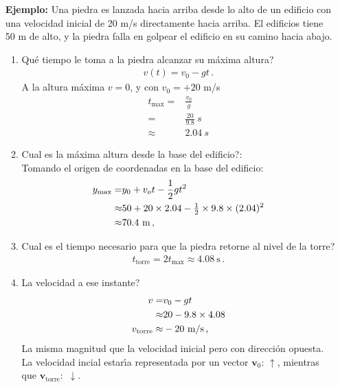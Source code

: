 \begin{itemize}
\item[\textbf{Ejemplo:}] Una piedra es lanzada hacia arriba desde lo alto de un edificio con una velocidad inicial de 20 m/s directamente hacia arriba. El edificios tiene 50 m de alto, y la piedra falla en golpear el edificio en su camino hacia abajo.
  \begin{enumerate}
  \item \textquestiondown Qu\'e tiempo le toma a la piedra alcanzar su m\'axima altura?
    \begin{align}
      v(t)=v_0-gt\,.
    \end{align}
    A la altura m\'axima $v=0$, y con $v_0=+20$ m/s
    \begin{align}
      t_{\text{max}}=&\frac{v_0}{g}\nonumber\\
      =&\frac{20}{9.8}\ s\nonumber\\
      \approx&2.04\ s
    \end{align}
  \item \textquestiondown Cual es la m\'axima altura desde la base del edificio?:\\
    Tomando el origen de coordenadas en la base del edificio:
    \begin{align}
      y_{\text{max}}=&y_0+v_o t-\frac{1}{2}g t^2\nonumber\\
      \approx&50+20\times2.04-\tfrac{1}{2}\times9.8\times(2.04)^2\nonumber\\
      \approx&70.4\ \text{m}\,,
    \end{align}
  \item \textquestiondown Cual es el tiempo necesario para que la piedra retorne al nivel de la torre?\\
    \begin{align}
      t_{\text{torre}}=2t_{\text{max}}\approx4.08\ \text{s}\,.
    \end{align}
  \item \textquestiondown La velocidad a ese instante?\\
    \begin{align}
      v=&v_0-gt\nonumber\\
      \approx&20-9.8\times4.08\\
      v_{\text{torre}}\approx&-20\ \text{m/s}\,,
    \end{align}
    La misma magnitud que la velocidad inicial pero con direcci\'on opuesta. La velocidad incial estar\'\i a representada por un vector $\mathbf{v}_0$: $\uparrow$, mientras que $\mathbf{v}_{\text{torre}}:$ $\downarrow$.

\end{enumerate}
\end{itemize}
